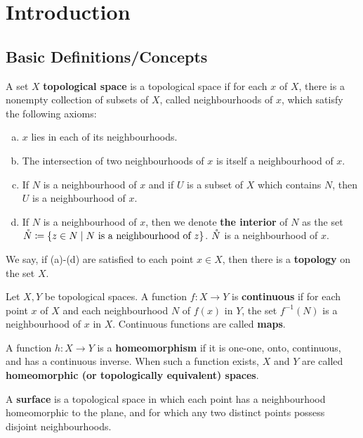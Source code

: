 \chapter{Introduction}

\section{Basic Definitions/Concepts}

\begin{definition}
    A set $X$ \textbf{topological space} is a topological space if for each $x$ of $X$, there is a nonempty collection of subsets of $X$, called neighbourhoods of $x$, which satisfy the following axioms:
    \begin{enumerate}[(a)]
        \item $x$ lies in each of its neighbourhoods.
        \item The intersection of two neighbourhoods of $x$ is itself a neighbourhood of $x$.
        \item If $N$ is a neighbourhood of $x$ and if $U$ is a subset of $X$ which contains $N$, then $U$ is a neighbourhood of $x$.
        \item If $N$ is a neighbourhood of $x$, then we denote \textbf{the interior} of $N$ as the set $\mathring{N}\coloneq\{z \in N \mid N \text{ is a neighbourhood of $z$}\}$. $\mathring{N}$ is a neighbourhood of $x$.
    \end{enumerate}
    We say, if (a)-(d) are satisfied to each point $x \in X$, then there is a \textbf{topology} on the set $X$.
\end{definition}
\begin{definition}[Map]
    Let $X,Y$ be topological spaces. A function $f\colon X\to Y$ is \textbf{continuous} if for each point $x$ of $X$ and each neighbourhood $N$ of $f(x)$ in $Y$, the set $f^{-1}(N)$ is a neighbourhood of $x$ in $X$. Continuous functions are called \textbf{maps}.
\end{definition}
\begin{definition}[Homeomorphism]
    A function $h\colon X\to Y$ is a \textbf{homeomorphism} if it is one-one, onto, continuous, and has a continuous inverse. When such a function exists, $X$ and $Y$ are called \textbf{homeomorphic (or topologically equivalent) spaces}.
\end{definition}
\begin{definition}[Surface]
    A \textbf{surface} is a topological space in which each point has a neighbourhood homeomorphic to the plane, and for which any two distinct points possess disjoint neighbourhoods.
\end{definition}
